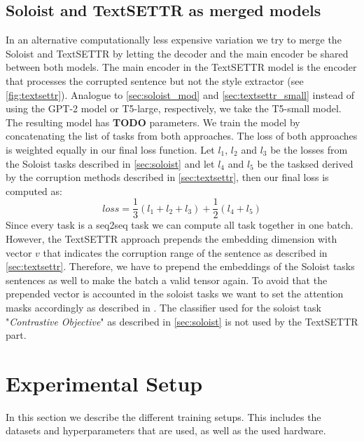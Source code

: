 \documentclass[twocolumn]{tum-article}
\begin{document}
\subsection{Soloist and TextSETTR as merged models}
In an alternative computationally less expensive variation we try to merge the Soloist and TextSETTR by letting the decoder and the main encoder be shared between both models. The main encoder in the TextSETTR model is the encoder that processes the corrupted sentence but not the style extractor (see \autoref{fig:textsettr}). Analogue to \autoref{sec:soloist_mod} and \autoref{sec:textsettr_small} instead of using the GPT-2 model or T5-large, respectively, we take the T5-small model. The resulting model has \textbf{TODO} parameters. We train the model by concatenating the list of tasks from both approaches. The loss of both approaches is weighted equally in our final loss function. Let $l_1$, $l_2$ and $l_3$ be the losses from the Soloist tasks described in \autoref{sec:soloist} and let $l_4$ and $l_5$ be the tasksed derived by the corruption methods described in \autoref{sec:textsettr}, then our final loss is computed as:
$$
loss = \frac{1}{3}(l_1 + l_2 + l_3) + \frac{1}{2} (l_4 + l_5)
$$
Since every task is a seq2seq task we can compute all task together in one batch. However, the TextSETTR approach prepends the embedding dimension with vector $v$ that indicates the corruption range of the sentence as described in \autoref{sec:textsettr}. Therefore, we have to prepend the embeddings of the Soloist tasks sentences as well to make the batch a valid tensor again. To avoid that the prepended vector is accounted in the soloist tasks we want to set the attention masks accordingly as described in \cite{vaswani2017attention}. The classifier used for the soloist task "\textit{Contrastive Objective}" as described in \autoref{sec:soloist} is not used by the TextSETTR part.
\section{Experimental Setup}
In this section we describe the different training setups. This includes the datasets and hyperparameters that are used, as well as the used hardware.
\end{document}
